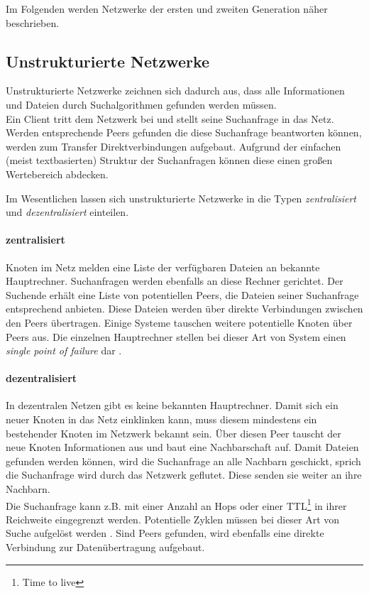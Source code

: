 Im Folgenden werden Netzwerke der ersten und zweiten Generation näher beschrieben.

\subsection{Unstrukturierte Netzwerke}
Unstrukturierte Netzwerke zeichnen sich dadurch aus, dass alle Informationen und Dateien durch Suchalgorithmen \cite{Lv2002} gefunden werden müssen. \\
Ein Client tritt dem Netzwerk bei und stellt seine Suchanfrage in das Netz. Werden entsprechende Peers gefunden die diese Suchanfrage beantworten können, werden zum Transfer Direktverbindungen aufgebaut. Aufgrund der einfachen (meist textbasierten) Struktur der Suchanfragen können diese einen großen Wertebereich abdecken.

Im Wesentlichen lassen sich unstrukturierte Netzwerke in die Typen \emph{zentralisiert} und \emph{dezentralisiert} einteilen.

\paragraph{zentralisiert} Knoten im Netz melden eine Liste der verfügbaren Dateien an bekannte Hauptrechner. Suchanfragen werden ebenfalls an diese Rechner gerichtet. Der Suchende erhält eine Liste von potentiellen Peers, die Dateien seiner Suchanfrage entsprechend anbieten. Diese Dateien werden über direkte Verbindungen zwischen den Peers übertragen. Einige Systeme tauschen weitere potentielle Knoten über Peers aus. Die einzelnen Hauptrechner stellen bei dieser Art von System einen \emph{single point of failure} dar \cite{Eberspaecher2005}.

\paragraph{dezentralisiert} In dezentralen Netzen gibt es keine bekannten Hauptrechner. Damit sich ein neuer Knoten in das Netz einklinken kann, muss diesem mindestens ein bestehender Knoten im Netzwerk bekannt sein. Über diesen Peer tauscht der neue Knoten Informationen aus und baut eine Nachbarschaft auf. Damit Dateien gefunden werden können, wird die Suchanfrage an alle Nachbarn geschickt, sprich die Suchanfrage wird durch das Netzwerk geflutet. Diese senden sie weiter an ihre Nachbarn.\\
Die Suchanfrage kann z.B. mit einer Anzahl an Hops oder einer TTL\footnote{Time to live} in ihrer Reichweite eingegrenzt werden. Potentielle Zyklen müssen bei dieser Art von Suche aufgelöst werden \cite{Lv2002}. Sind Peers gefunden, wird ebenfalls eine direkte Verbindung zur Datenübertragung aufgebaut. 

